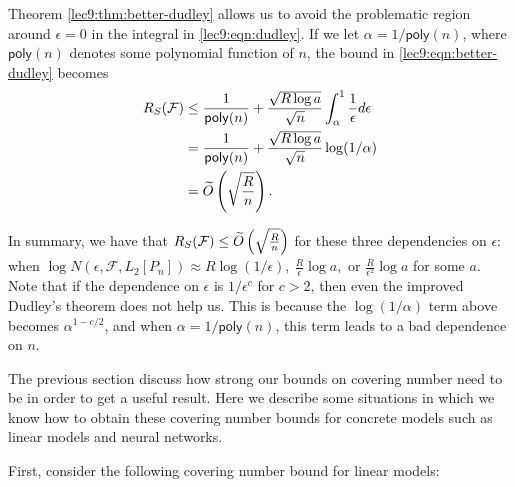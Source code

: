 \begin{enumerate}
Theorem \ref{lec9:thm:better-dudley} allows us to avoid the problematic region around $\epsilon=0$ in the integral in \eqref{lec9:eqn:dudley}. If we let $\alpha = 1/\mathsf{poly}(n)$, where $\mathsf{poly}(n)$ denotes some polynomial function of $n$, the bound in \eqref{lec9:eqn:better-dudley} becomes
\begin{align}
R_S(\mathcal{F}) &\leq \frac{1}{\mathsf{poly}(n)} + \frac{\sqrt{R\log a}}{\sqrt{n}}\int_{\alpha}^1\frac{1}{\epsilon}d\epsilon \\
&= \frac{1}{\mathsf{poly}(n)}  + \frac{\sqrt{R\log a}}{\sqrt{n}} \log(1/\alpha) \\
&= \widetilde{O} \left(\sqrt{\frac{R}{n}}\right).
\end{align}
\end{enumerate}

In summary, we have that $R_S(\mathcal{F}) \leq \widetilde{O}\left(\sqrt{\frac{R}{n}}\right)$ for these three dependencies on $\epsilon$: when $\log N(\epsilon, \mathcal{F}, L_2[P_n]) \approx R\log (1/\epsilon),\ \frac{R}{\epsilon} \log a,\text{ or } \frac{R}{\epsilon^2} \log a$ for some $a$. Note that if the dependence on $\epsilon$ is $1/\epsilon^c$ for $c > 2$, then even the improved Dudley's theorem does not help us. This is because the $\log(1/\alpha)$ term above becomes $\alpha^{1-c/2}$, and when $\alpha = 1/\mathsf{poly}(n)$, this term leads to a bad dependence on $n$.

The previous section discuss how strong our bounds on covering number need to be in order to get a useful result. 
Here we describe some situations in which we know how to obtain these covering number bounds for concrete models such as linear models and neural networks. 

First, consider the following covering number bound for linear models:

